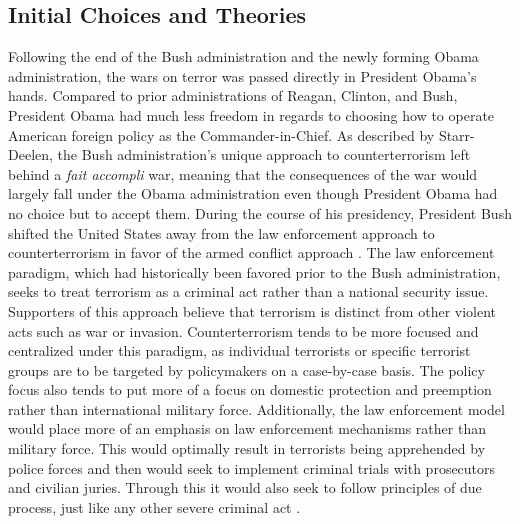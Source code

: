 \documentclass[12pt]{article}
\begin{document}
\subsection*{Initial Choices and Theories}
Following the end of the Bush administration and the newly forming Obama administration, the wars on terror was passed directly in President Obama's hands.
Compared to prior administrations of Reagan, Clinton, and Bush, President Obama had much less freedom in regards to choosing how to operate American foreign policy as the Commander-in-Chief.
As described by Starr-Deelen, the Bush administration's unique approach to counterterrorism left behind a \textit{fait accompli} war, meaning that the consequences of the war would largely fall under the Obama administration even though President Obama had no choice but to accept them.
During the course of his presidency, President Bush shifted the United States away from the law enforcement approach to counterterrorism in favor of the armed conflict approach \autocite[2]{starr-deelen2018}.
The law enforcement paradigm, which had historically been favored prior to the Bush administration, seeks to treat terrorism as a criminal act rather than a national security issue.
Supporters of this approach believe that terrorism is distinct from other violent acts such as war or invasion.
Counterterrorism tends to be more focused and centralized under this paradigm, as individual terrorists or specific terrorist groups are to be targeted by policymakers on a case-by-case basis.
The policy focus also tends to put more of a focus on domestic protection and preemption rather than international military force.
Additionally, the law enforcement model would place more of an emphasis on law enforcement mechanisms rather than military force.
This would optimally result in terrorists being apprehended by police forces and then would seek to implement criminal trials with prosecutors and civilian juries.
Through this it would also seek to follow principles of due process, just like any other severe criminal act \autocite[3]{starr-deelen2018}.
\end{document}
